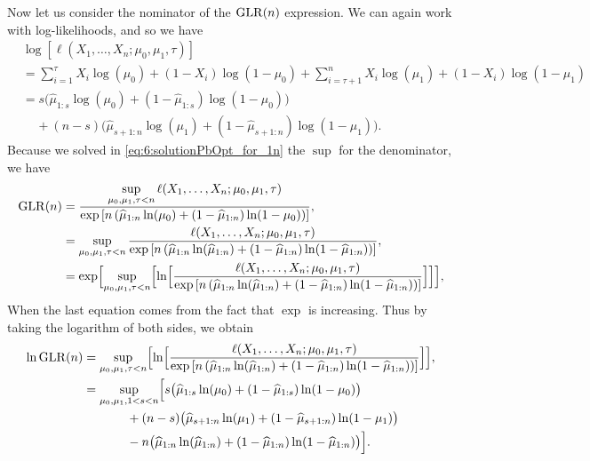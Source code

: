     Now let us consider the nominator of the $\mathrm{GLR}(n)$ expression.
    We can again work with log-likelihoods, and so we have
    \begin{align*}
        & \log \left[ \ell(X_1, \dots, X_n ; \mu_0,\mu_1,\tau) \right] \\
        &= \sum_{i=1}^{\tau} X_i \log(\mu_0) + (1-X_i) \log(1-\mu_0) + \sum_{i=\tau+1}^n X_i \log(\mu_1) + (1-X_i) \log(1-\mu_1) \\
        &= s \bigl( \widehat{\mu}_{1:s} \log(\mu_0) + (1 - \widehat{\mu}_{1:s}) \log(1-\mu_0) \bigr) \\
        & \;\;\;\; + (n-s) \bigl( \widehat{\mu}_{s+1:n} \log(\mu_1) + (1 - \widehat{\mu}_{s+1:n}) \log(1-\mu_1) \bigr).
    \end{align*}
    Because we solved in \eqref{eq:6:solutionPbOpt_for_1n} the $\sup$ for the denominator,
    we have
    \begin{align*}
        \mathrm{GLR}(n)
        &= \frac{\sup\limits_{\mu_0,\mu_1,\tau < n}\ell(X_1, \dots, X_n ; \mu_0,\mu_1,\tau)}{ \exp\left[ n \left( \widehat{\mu}_{1:n} \ln(\mu_0) + (1 - \widehat{\mu}_{1:n}) \ln(1-\mu_0) \right) \right] }, \\
        &= \sup\limits_{\mu_0,\mu_1,\tau < n} \frac{\ell(X_1, \dots, X_n ; \mu_0,\mu_1,\tau)}{ \exp\left[ n \left( \widehat{\mu}_{1:n} \ln(\widehat{\mu}_{1:n}) + (1 - \widehat{\mu}_{1:n}) \ln(1-\widehat{\mu}_{1:n}) \right) \right] }, \\
        &= \exp \Bigl[ \sup\limits_{\mu_0,\mu_1,\tau < n} \Bigl[ \ln\Bigl[ \frac{\ell(X_1, \dots, X_n ; \mu_0,\mu_1,\tau)}{ \exp\left[ n \left( \widehat{\mu}_{1:n} \ln(\widehat{\mu}_{1:n}) + (1 - \widehat{\mu}_{1:n}) \ln(1-\widehat{\mu}_{1:n}) \right) \right] } \Bigr] \Bigr] \Bigr],
    \end{align*}
    When the last equation comes from the fact that $\exp$ is increasing.
    Thus by taking the logarithm of both sides, we obtain
    \begin{align*}
        \ln \mathrm{GLR}(n)
        &= \sup\limits_{\mu_0,\mu_1,\tau < n} \Bigl[ \ln\Bigl[ \frac{\ell(X_1, \dots, X_n ; \mu_0,\mu_1,\tau)}{ \exp\left[ n \left( \widehat{\mu}_{1:n} \ln(\widehat{\mu}_{1:n}) + (1 - \widehat{\mu}_{1:n}) \ln(1-\widehat{\mu}_{1:n}) \right) \right] } \Bigr] \Bigr],  \\
        &= \sup\limits_{\mu_0,\mu_1, 1 < s < n} \Bigl[
            s \bigl( \widehat{\mu}_{1:s} \ln(\mu_0) + (1 - \widehat{\mu}_{1:s}) \ln(1-\mu_0) \bigr) \\
            & \hspace{35pt} + (n-s) \bigl( \widehat{\mu}_{s+1:n} \ln(\mu_1) + (1 - \widehat{\mu}_{s+1:n}) \ln(1-\mu_1) \bigr) \\
            & \hspace{35pt} - n \bigl( \widehat{\mu}_{1:n} \ln(\widehat{\mu}_{1:n}) + (1 - \widehat{\mu}_{1:n}) \ln(1-\widehat{\mu}_{1:n}) \bigr)
        \Bigr].
    \end{align*}
